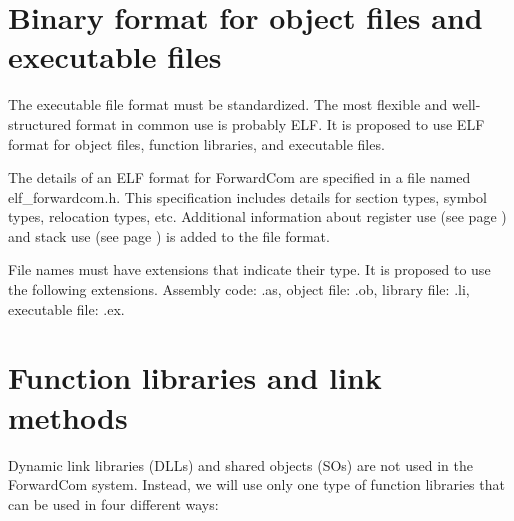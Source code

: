 \documentclass[forwardcom.tex]{subfiles}
\begin{document}
\RaggedRight

\section{Binary format for object files and executable files} \label{objectFileFormat}
The executable file format must be standardized. The most flexible and well-structured format in common use is probably ELF. It is proposed to use ELF format for object files, function libraries, and executable files. 
\vspace{2mm}

The details of an ELF format for ForwardCom are specified in a file named elf\_forwardcom.h. This specification includes details for section types, symbol types, relocation types, etc. Additional information about register use (see page \pageref{registerUsageConvention}) and stack use (see page \pageref{predictingStackSize}) is added to the file format. 
\vspace{2mm}

File names must have extensions that indicate their type. It is proposed to use the following extensions. Assembly code: .as, object file: .ob, library file: .li, executable file: .ex. 
\vspace{2mm}

\section{Function libraries and link methods} \label{libraryLinkMethods}
Dynamic link libraries (DLLs) and shared objects (SOs) are not used in the ForwardCom system. Instead, we will use only one type of function libraries that can be used in four different ways: 
\end{document}

